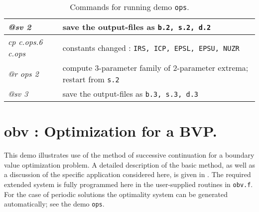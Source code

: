 \documentclass[12pt]{report}
\begin{document}
\begin{table}[htbp]
\begin{center}
\begin{tabular}{| l | l |}
  {\it @sv 2} & save the output-files as {\tt b.2, s.2, d.2} \\ 
\hline
  {\it cp c.ops.6 c.ops} & constants changed : {\tt IRS, ICP, EPSL, EPSU, NUZR} \\ 
  {\it @r ops 2} & compute 3-parameter family of 2-parameter extrema; restart from {\tt s.2} \\ 
  {\it @sv 3} & save the output-files as {\tt b.3, s.3, d.3} \\ 
\hline
\end{tabular}
\caption{Commands for running demo {\tt ops}.}
\label{tbl:demo_ops_4}
\end{center}
\end{table}

\newpage
\section{ obv : Optimization for a BVP.} \label{sec:Demos_obv}
This demo illustrates use of the method of successive continuation
for a  boundary value optimization problem.
A detailed description of the basic method, as well as a discussion
of the specific application considered here, is given in 
 \citeyear{DoKeKe:91b}.
The required extended system is fully programmed here in the user-supplied
routines in {\tt obv.f}.
For the case of periodic solutions the optimality system can be generated
automatically; see the demo {\tt ops}.
\end{document}

